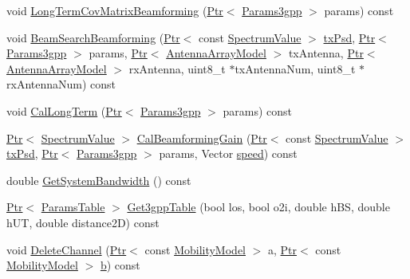 \begin{DoxyCompactItemize}
\item 
void \hyperlink{classns3_1_1MmWave3gppChannel_a1ef519a7796d45ef5270e465664fd1bb}{Long\+Term\+Cov\+Matrix\+Beamforming} (\hyperlink{classns3_1_1Ptr}{Ptr}$<$ \hyperlink{structns3_1_1Params3gpp}{Params3gpp} $>$ params) const 
\item 
void \hyperlink{classns3_1_1MmWave3gppChannel_ac361c14154934a6e7633a0a8c561e788}{Beam\+Search\+Beamforming} (\hyperlink{classns3_1_1Ptr}{Ptr}$<$ const \hyperlink{classns3_1_1SpectrumValue}{Spectrum\+Value} $>$ \hyperlink{lte__link__budget__x2__handover__measures_8m_a684fe3101a5e48a5fcc57cab8dbcd1aa}{tx\+Psd}, \hyperlink{classns3_1_1Ptr}{Ptr}$<$ \hyperlink{structns3_1_1Params3gpp}{Params3gpp} $>$ params, \hyperlink{classns3_1_1Ptr}{Ptr}$<$ \hyperlink{classns3_1_1AntennaArrayModel}{Antenna\+Array\+Model} $>$ tx\+Antenna, \hyperlink{classns3_1_1Ptr}{Ptr}$<$ \hyperlink{classns3_1_1AntennaArrayModel}{Antenna\+Array\+Model} $>$ rx\+Antenna, uint8\+\_\+t $\ast$tx\+Antenna\+Num, uint8\+\_\+t $\ast$rx\+Antenna\+Num) const 
\item 
void \hyperlink{classns3_1_1MmWave3gppChannel_ab1cacdfc31ed5b10bc2dc5206153ec57}{Cal\+Long\+Term} (\hyperlink{classns3_1_1Ptr}{Ptr}$<$ \hyperlink{structns3_1_1Params3gpp}{Params3gpp} $>$ params) const 
\item 
\hyperlink{classns3_1_1Ptr}{Ptr}$<$ \hyperlink{classns3_1_1SpectrumValue}{Spectrum\+Value} $>$ \hyperlink{classns3_1_1MmWave3gppChannel_acd8bc1db086ba52b0e77ed71a6ccb56d}{Cal\+Beamforming\+Gain} (\hyperlink{classns3_1_1Ptr}{Ptr}$<$ const \hyperlink{classns3_1_1SpectrumValue}{Spectrum\+Value} $>$ \hyperlink{lte__link__budget__x2__handover__measures_8m_a684fe3101a5e48a5fcc57cab8dbcd1aa}{tx\+Psd}, \hyperlink{classns3_1_1Ptr}{Ptr}$<$ \hyperlink{structns3_1_1Params3gpp}{Params3gpp} $>$ params, Vector \hyperlink{mmwave-amc-test_8cc_a6dc6e6f3c75c509ce943163afb5dade7}{speed}) const 
\item 
double \hyperlink{classns3_1_1MmWave3gppChannel_aff34062721c2775f51890cbf23702d99}{Get\+System\+Bandwidth} () const 
\item 
\hyperlink{classns3_1_1Ptr}{Ptr}$<$ \hyperlink{structns3_1_1ParamsTable}{Params\+Table} $>$ \hyperlink{classns3_1_1MmWave3gppChannel_a4d31cc933c700d3b6c405b47765a2b02}{Get3gpp\+Table} (bool los, bool o2i, double h\+BS, double h\+UT, double distance2D) const 
\item 
void \hyperlink{classns3_1_1MmWave3gppChannel_a3ec4e2d8d84d7876581a00fa5174a1a5}{Delete\+Channel} (\hyperlink{classns3_1_1Ptr}{Ptr}$<$ const \hyperlink{classns3_1_1MobilityModel}{Mobility\+Model} $>$ a, \hyperlink{classns3_1_1Ptr}{Ptr}$<$ const \hyperlink{classns3_1_1MobilityModel}{Mobility\+Model} $>$ \hyperlink{lte__pathloss_8m_a21ad0bd836b90d08f4cf640b4c298e7c}{b}) const 

\end{DoxyCompactItemize}

